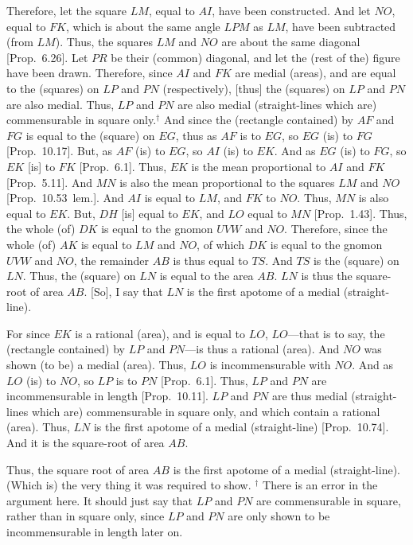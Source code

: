 Therefore, let the square $LM$, equal to $AI$, have been constructed.
And let $NO$, equal to $FK$, which is about the
same angle $LPM$ as $LM$, have been subtracted (from $LM$).
Thus, the squares $LM$ and $NO$ are about the same diagonal
[Prop.~6.26]. Let $PR$ be their (common) diagonal, and
let the (rest of the) figure have been drawn. Therefore, since $AI$ and $FK$
are medial (areas), and are equal to the (squares) on $LP$ and $PN$
(respectively), [thus] the (squares) on $LP$ and $PN$ are also medial.
Thus, $LP$ and $PN$ are  also medial (straight-lines which are)
commensurable in square only.$^\dag$ And since the (rectangle contained) by
$AF$ and $FG$ is equal to the (square) on $EG$, thus as $AF$ is to $EG$, so $EG$ (is) to $FG$ [Prop.~10.17]. But, as
$AF$ (is) to $EG$, so $AI$ (is) to $EK$. And as $EG$ (is) to $FG$, so
$EK$ [is] to $FK$ [Prop.~6.1]. Thus, $EK$ is the mean proportional to $AI$ and $FK$ [Prop.~5.11].
And $MN$ is also the mean proportional to the squares $LM$ and $NO$ [Prop.~10.53~lem.]. 
And $AI$ is equal to $LM$, and $FK$ to $NO$. 
Thus, $MN$ is also equal to
$EK$. But, $DH$ [is] equal to $EK$, and $LO$ equal to $MN$ [Prop.~1.43]. Thus, the whole  (of) $DK$ is equal to
the gnomon $UVW$ and $NO$. Therefore, since the whole (of) $AK$
is equal to $LM$ and $NO$, of which $DK$ is equal to the
gnomon $UVW$ and $NO$,  the remainder $AB$ is thus equal to $TS$.
And $TS$ is the (square) on $LN$. Thus, the (square) on $LN$
is equal to the area $AB$. $LN$ is thus the square-root of area $AB$.
[So], I say that $LN$ is the first apotome of a medial (straight-line).

For since $EK$ is a rational (area), and is equal to $LO$, $LO$---that is to
say, the (rectangle contained) by $LP$ and $PN$---is thus
a rational (area). And $NO$ was shown (to be) a medial (area). Thus,
$LO$ is incommensurable  with $NO$. And as $LO$ (is) to $NO$,
so $LP$ is to $PN$ [Prop.~6.1]. Thus,  $LP$ and
$PN$ are incommensurable in length [Prop.~10.11]. 
$LP$ and $PN$ are thus medial (straight-lines which are) commensurable
in square only, and which contain a rational (area). Thus, $LN$ is the
first apotome of a medial (straight-line) [Prop.~10.74]. And it is the square-root of area $AB$.

Thus, the square root of area $AB$ is the first apotome of a medial (straight-line). (Which is) the very thing it was required to show.
{\footnotesize\noindent$^\dag$ There is an error in the argument here. It should just say that $LP$ and $PN$ are commensurable in square,
rather than in square only, since $LP$ and $PN$ are only shown
to be incommensurable in length later on.}

